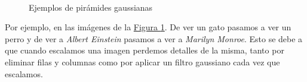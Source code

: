 \documentclass[11pt,a4paper]{article}
\theoremstyle{plain}
\theoremstyle{definition}
\begin{document}
\begin{figure}[!h]
    \centering
    \mbox{
    \qquad
    }
    \caption{Ejemplos de pirámides gaussianas}
    \label{piramide}
\end{figure}

Por ejemplo, en las imágenes de la \hyperref[piramide]{Figura \ref*{piramide}}. De ver un gato pasamos a ver un perro y de ver a \textit{Albert Einstein} pasamos a ver a \textit{Marilyn Monroe}. Esto se debe a que cuando escalamos una imagen perdemos detalles de la misma, tanto por eliminar filas y columnas como por aplicar un filtro gaussiano cada vez que escalamos. 
\end{document}

